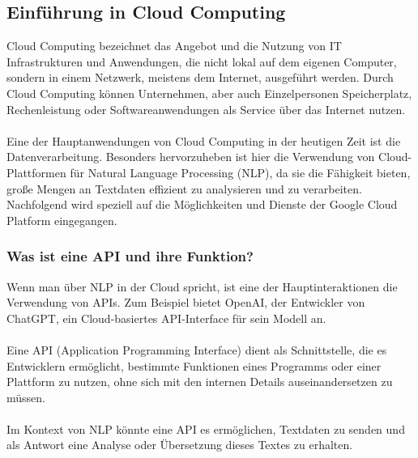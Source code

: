 \documentclass[12pt,a4paper]{article}
\begin{document}
\subsection{Einführung in Cloud Computing}
Cloud Computing bezeichnet das Angebot und die Nutzung von IT Infrastrukturen und Anwendungen, die nicht lokal auf dem eigenen Computer, sondern in einem Netzwerk, meistens dem Internet, ausgeführt werden. Durch Cloud Computing können Unternehmen, aber auch Einzelpersonen Speicherplatz, Rechenleistung oder Softwareanwendungen als Service über das Internet nutzen.
\\	\\
Eine der Hauptanwendungen von Cloud Computing in der heutigen Zeit ist die Datenverarbeitung. Besonders hervorzuheben ist hier die Verwendung von Cloud-Plattformen für Natural Language Processing (NLP), da sie die Fähigkeit bieten, große Mengen an Textdaten effizient zu analysieren und zu verarbeiten. Nachfolgend wird speziell auf die Möglichkeiten und Dienste der Google Cloud Platform eingegangen.
\subsubsection{Was ist eine API und ihre Funktion?}
Wenn man über NLP in der Cloud spricht, ist eine der Hauptinteraktionen die Verwendung von APIs. Zum Beispiel bietet OpenAI, der Entwickler von ChatGPT, ein Cloud-basiertes API-Interface für sein Modell an.
\\ \\
Eine API (Application Programming Interface) dient als Schnittstelle, die es Entwicklern ermöglicht, bestimmte Funktionen eines Programms oder einer Plattform zu nutzen, ohne sich mit den internen Details auseinandersetzen zu müssen. 
\\ \\
Im Kontext von NLP könnte eine API es ermöglichen, Textdaten zu senden und als Antwort eine Analyse oder Übersetzung dieses Textes zu erhalten.
	
	\begin{center}
	\end{center}
	
\end{document}
